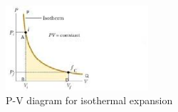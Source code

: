 \documentclass[a4paper,12pt]{article}
\begin{document}
\begin{figure}[h]
	\begin{center}
		\includegraphics[width=200px]{me20b027b.eps}
	\end{center}
	\caption{P-V diagram for isothermal expansion~\cite{donev_me027}}
	\label{gr:istexp}
\end{figure}



\end{document}
